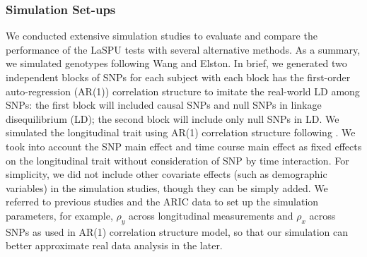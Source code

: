 \documentclass[12pt]{article}
\begin{document}
\subsubsection{Simulation Set-ups}
We conducted extensive simulation studies to evaluate and compare the performance of the LaSPU tests with several alternative methods. As a summary, we simulated genotypes following Wang and Elston. \cite{Wang2007} In brief, we generated two independent blocks of SNPs for each subject with each block has the first-order auto-regression (AR(1)) correlation structure to imitate the real-world LD among SNPs: the first block will included causal SNPs and null SNPs in linkage disequilibrium (LD); the second block will include only null SNPs in LD. We simulated the longitudinal trait using AR(1) correlation structure following \cite{Song2013}. We took into account the SNP main effect and time course main effect as fixed effects on the longitudinal trait {without consideration of SNP by time interaction}. For simplicity, we did not include other covariate effects (such as demographic variables) in the simulation studies, though they can be simply added. We referred to previous studies \cite{pan2014powerful,Basu2011,Pan2011,Han2010,Pan2009} and the ARIC data to set up the simulation parameters, for example, $\rho_y$ across longitudinal measurements and $\rho_x$ across SNPs as used in AR(1) correlation structure model, so that our simulation can better approximate real data analysis in the later.

\end{document}
